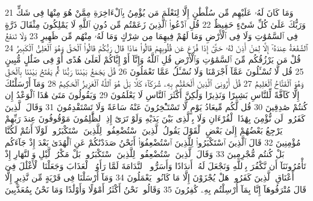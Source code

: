{\tiny\colorbox{cl_aya}{21}} وَمَا كَانَ لَهُۥ عَلَيْهِم مِّن سُلْطَٰنٍ إِلَّا لِنَعْلَمَ مَن يُؤْمِنُ بِٱلْءَاخِرَةِ مِمَّنْ هُوَ مِنْهَا فِى شَكٍّ وَرَبُّكَ عَلَىٰ كُلِّ شَىْءٍ حَفِيظٌ
{\tiny\colorbox{cl_aya}{22}} قُلِ ٱدْعُوا۟ ٱلَّذِينَ زَعَمْتُم مِّن دُونِ ٱللَّهِ لَا يَمْلِكُونَ مِثْقَالَ ذَرَّةٍ فِى ٱلسَّمَٰوَٰتِ وَلَا فِى ٱلْأَرْضِ وَمَا لَهُمْ فِيهِمَا مِن شِرْكٍ وَمَا لَهُۥ مِنْهُم مِّن ظَهِيرٍ
{\tiny\colorbox{cl_aya}{23}} وَلَا تَنفَعُ ٱلشَّفَٰعَةُ عِندَهُۥٓ إِلَّا لِمَنْ أَذِنَ لَهُۥ حَتَّىٰٓ إِذَا فُزِّعَ عَن قُلُوبِهِمْ قَالُوا۟ مَاذَا قَالَ رَبُّكُمْ قَالُوا۟ ٱلْحَقَّ وَهُوَ ٱلْعَلِىُّ ٱلْكَبِيرُ
{\tiny\colorbox{cl_aya}{24}} قُلْ مَن يَرْزُقُكُم مِّنَ ٱلسَّمَٰوَٰتِ وَٱلْأَرْضِ قُلِ ٱللَّهُ وَإِنَّآ أَوْ إِيَّاكُمْ لَعَلَىٰ هُدًى أَوْ فِى ضَلَٰلٍ مُّبِينٍ
{\tiny\colorbox{cl_aya}{25}} قُل لَّا تُسْـَٔلُونَ عَمَّآ أَجْرَمْنَا وَلَا نُسْـَٔلُ عَمَّا تَعْمَلُونَ
{\tiny\colorbox{cl_aya}{26}} قُلْ يَجْمَعُ بَيْنَنَا رَبُّنَا ثُمَّ يَفْتَحُ بَيْنَنَا بِٱلْحَقِّ وَهُوَ ٱلْفَتَّاحُ ٱلْعَلِيمُ
{\tiny\colorbox{cl_aya}{27}} قُلْ أَرُونِىَ ٱلَّذِينَ أَلْحَقْتُم بِهِۦ شُرَكَآءَ كَلَّا بَلْ هُوَ ٱللَّهُ ٱلْعَزِيزُ ٱلْحَكِيمُ
{\tiny\colorbox{cl_aya}{28}} وَمَآ أَرْسَلْنَٰكَ إِلَّا كَآفَّةً لِّلنَّاسِ بَشِيرًا وَنَذِيرًا وَلَٰكِنَّ أَكْثَرَ ٱلنَّاسِ لَا يَعْلَمُونَ
{\tiny\colorbox{cl_aya}{29}} وَيَقُولُونَ مَتَىٰ هَٰذَا ٱلْوَعْدُ إِن كُنتُمْ صَٰدِقِينَ
{\tiny\colorbox{cl_aya}{30}} قُل لَّكُم مِّيعَادُ يَوْمٍ لَّا تَسْتَـْٔخِرُونَ عَنْهُ سَاعَةً وَلَا تَسْتَقْدِمُونَ
{\tiny\colorbox{cl_aya}{31}} وَقَالَ ٱلَّذِينَ كَفَرُوا۟ لَن نُّؤْمِنَ بِهَٰذَا ٱلْقُرْءَانِ وَلَا بِٱلَّذِى بَيْنَ يَدَيْهِ وَلَوْ تَرَىٰٓ إِذِ ٱلظَّٰلِمُونَ مَوْقُوفُونَ عِندَ رَبِّهِمْ يَرْجِعُ بَعْضُهُمْ إِلَىٰ بَعْضٍ ٱلْقَوْلَ يَقُولُ ٱلَّذِينَ ٱسْتُضْعِفُوا۟ لِلَّذِينَ ٱسْتَكْبَرُوا۟ لَوْلَآ أَنتُمْ لَكُنَّا مُؤْمِنِينَ
{\tiny\colorbox{cl_aya}{32}} قَالَ ٱلَّذِينَ ٱسْتَكْبَرُوا۟ لِلَّذِينَ ٱسْتُضْعِفُوٓا۟ أَنَحْنُ صَدَدْنَٰكُمْ عَنِ ٱلْهُدَىٰ بَعْدَ إِذْ جَآءَكُم بَلْ كُنتُم مُّجْرِمِينَ
{\tiny\colorbox{cl_aya}{33}} وَقَالَ ٱلَّذِينَ ٱسْتُضْعِفُوا۟ لِلَّذِينَ ٱسْتَكْبَرُوا۟ بَلْ مَكْرُ ٱلَّيْلِ وَٱلنَّهَارِ إِذْ تَأْمُرُونَنَآ أَن نَّكْفُرَ بِٱللَّهِ وَنَجْعَلَ لَهُۥٓ أَندَادًا وَأَسَرُّوا۟ ٱلنَّدَامَةَ لَمَّا رَأَوُا۟ ٱلْعَذَابَ وَجَعَلْنَا ٱلْأَغْلَٰلَ فِىٓ أَعْنَاقِ ٱلَّذِينَ كَفَرُوا۟ هَلْ يُجْزَوْنَ إِلَّا مَا كَانُوا۟ يَعْمَلُونَ
{\tiny\colorbox{cl_aya}{34}} وَمَآ أَرْسَلْنَا فِى قَرْيَةٍ مِّن نَّذِيرٍ إِلَّا قَالَ مُتْرَفُوهَآ إِنَّا بِمَآ أُرْسِلْتُم بِهِۦ كَٰفِرُونَ
{\tiny\colorbox{cl_aya}{35}} وَقَالُوا۟ نَحْنُ أَكْثَرُ أَمْوَٰلًا وَأَوْلَٰدًا وَمَا نَحْنُ بِمُعَذَّبِينَ
